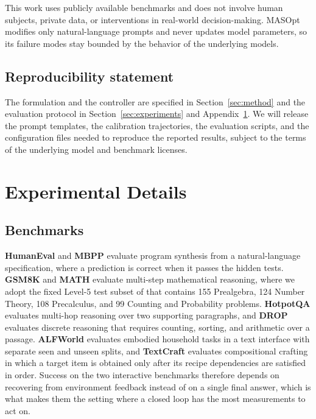 \documentclass{article}
\theoremstyle{definition}
\begin{document}
This work uses publicly available benchmarks and does not involve human subjects, private data, or interventions in real-world decision-making. MASOpt modifies only natural-language prompts and never updates model parameters, so its failure modes stay bounded by the behavior of the underlying models.

\subsection*{Reproducibility statement}

The formulation and the controller are specified in Section~\ref{sec:method} and the evaluation protocol in Section~\ref{sec:experiments} and Appendix~\ref{app:experimental-details}. We will release the prompt templates, the calibration trajectories, the evaluation scripts, and the configuration files needed to reproduce the reported results, subject to the terms of the underlying model and benchmark licenses.




\appendix

\section{Experimental Details}
\label{app:experimental-details}

\subsection{Benchmarks}
\label{app:data-splits}

\textbf{HumanEval} \citep{chen2021humaneval} and \textbf{MBPP} \citep{austin2021mbpp} evaluate program synthesis from a natural-language specification, where a prediction is correct when it passes the hidden tests. \textbf{GSM8K} \citep{cobbe2021gsm8k} and \textbf{MATH} \citep{hendrycks2021math} evaluate multi-step mathematical reasoning, where we adopt the fixed Level-5 test subset of \citet{zhang2024aflow} that contains 155 Prealgebra, 124 Number Theory, 108 Precalculus, and 99 Counting and Probability problems. \textbf{HotpotQA} \citep{yang2018hotpotqa} evaluates multi-hop reasoning over two supporting paragraphs, and \textbf{DROP} \citep{dua2019drop} evaluates discrete reasoning that requires counting, sorting, and arithmetic over a passage. \textbf{ALFWorld} \citep{shridhar2020alfworld} evaluates embodied household tasks in a text interface with separate seen and unseen splits, and \textbf{TextCraft} \citep{prasad2024textcraft} evaluates compositional crafting in which a target item is obtained only after its recipe dependencies are satisfied in order. Success on the two interactive benchmarks therefore depends on recovering from environment feedback instead of on a single final answer, which is what makes them the setting where a closed loop has the most measurements to act on.
\end{document}
